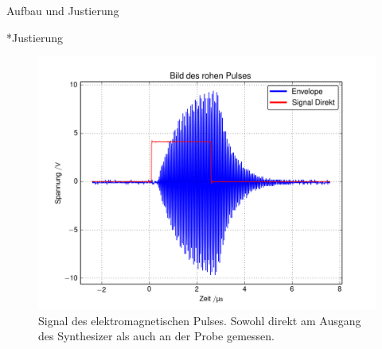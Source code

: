 \documentclass[pdftex, a4paper,11pt, twoside, ngerman]{report}
\begin{document}
  
  
  \begin{chapter}{Aufbau und Justierung}
    \label{chpAufbau}
    
    
    
    \begin{section}*{Justierung}
      \label{chpAufbauJustierung}
      
      \begin{figure}[htb]
        \centering
        \includegraphics[width=\textwidth]{Figures/RohPuls1.png}
        \caption{Signal des elektromagnetischen Pulses.
          Sowohl direkt am Ausgang des Synthesizer als auch an der Probe
          gemessen.}
        \label{figRohPuls}
      \end{figure}


      
    \end{section}
    
  \end{chapter}
  
  
  
\end{document}
